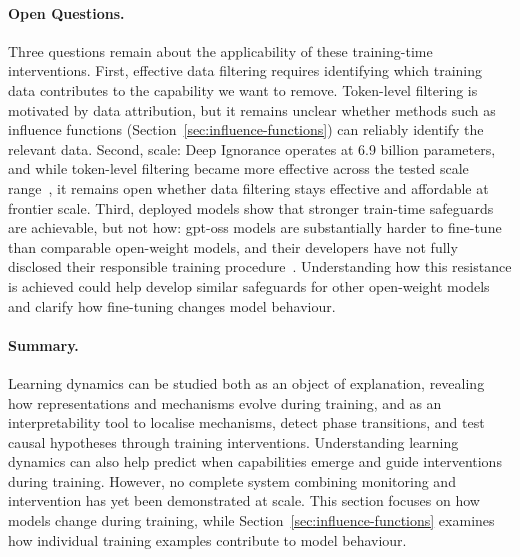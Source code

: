 \paragraph{Open Questions.}
Three questions remain about the applicability of these training-time interventions. First, effective data filtering requires identifying which training data contributes to the capability we want to remove. Token-level filtering is motivated by data attribution, but it remains unclear whether methods such as influence functions (Section~\ref{sec:influence-functions}) can reliably identify the relevant data. Second, scale: Deep Ignorance operates at 6.9 billion parameters, and while token-level filtering became more effective across the tested scale range~, it remains open whether data filtering stays effective and affordable at frontier scale. Third, deployed models show that stronger train-time safeguards are achievable, but not how: gpt-oss models are substantially harder to fine-tune than comparable open-weight models, and their developers have not fully disclosed their responsible training procedure~. Understanding how this resistance is achieved could help develop similar safeguards for other open-weight models and clarify how fine-tuning changes model behaviour.

\paragraph{Summary.}
Learning dynamics can be studied both as an object of explanation, revealing how representations and mechanisms evolve during training, and as an interpretability tool to localise mechanisms, detect phase transitions, and test causal hypotheses through training interventions. Understanding learning dynamics can also help predict when capabilities emerge and guide interventions during training. However, no complete system combining monitoring and intervention has yet been demonstrated at scale. This section focuses on how models change during training, while Section~\ref{sec:influence-functions} examines how individual training examples contribute to model behaviour.

